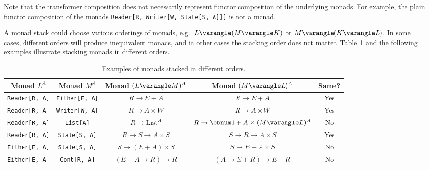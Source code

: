 Note that the transformer composition does not necessarily represent
functor composition of the underlying monads. For example, the plain
functor composition of the monads \lstinline!Reader[R, Writer[W, State[S, A]]]!
is not a monad.

A monad stack could choose various orderings of monads, e.g., $L\varangle(M\varangle K)$
or $M\varangle(K\varangle L)$. In some cases, different orders will
produce inequivalent monads, and in other cases the stacking order
does not matter. Table~\ref{tab:Examples-of-monad-stacks} and the
following examples illustrate stacking monads in different orders.

\begin{table}
\begin{centering}
\begin{tabular}{|c|c|c|c|c|}
\hline 
\textbf{\small{}Monad $L^{A}$} & \textbf{\small{}Monad $M^{A}$} & \textbf{\small{}Monad $(L\varangle M)^{A}$} & \textbf{\small{}Monad $(M\varangle L)^{A}$} & \textbf{\small{}Same?}\tabularnewline
\hline 
\hline 
{\small{}}\lstinline!Reader[R, A]! & {\small{}}\lstinline!Either[E, A]! & {\small{}$R\rightarrow E+A$} & {\small{}$R\rightarrow E+A$} & {\small{}Yes}\tabularnewline
\hline 
{\small{}}\lstinline!Reader[R, A]! & {\small{}}\lstinline!Writer[W, A]! & {\small{}$R\rightarrow A\times W$} & {\small{}$R\rightarrow A\times W$} & {\small{}Yes}\tabularnewline
\hline 
{\small{}}\lstinline!Reader[R, A]! & {\small{}}\lstinline!List[A]! & {\small{}$R\rightarrow\text{List}^{A}$} & {\small{}$R\rightarrow\bbnum 1+A\times(M\varangle L)^{A}$} & {\small{}No}\tabularnewline
\hline 
{\small{}}\lstinline!Reader[R, A]! & {\small{}}\lstinline!State[S, A]! & {\small{}$R\rightarrow S\rightarrow A\times S$} & {\small{}$S\rightarrow R\rightarrow A\times S$} & {\small{}Yes}\tabularnewline
\hline 
{\small{}}\lstinline!Either[E, A]! & {\small{}}\lstinline!State[S, A]! & {\small{}$S\rightarrow(E+A)\times S$} & {\small{}$S\rightarrow E+A\times S$} & {\small{}No}\tabularnewline
\hline 
{\small{}}\lstinline!Either[E, A]! & {\small{}}\lstinline!Cont[R, A]! & {\small{}$\left(E+A\rightarrow R\right)\rightarrow R$} & {\small{}$\left(A\rightarrow E+R\right)\rightarrow E+R$} & {\small{}No}\tabularnewline
\hline 
\end{tabular}
\par\end{centering}
\caption{\label{tab:Examples-of-monad-stacks}Examples of monads stacked in
different orders.}
\end{table}


